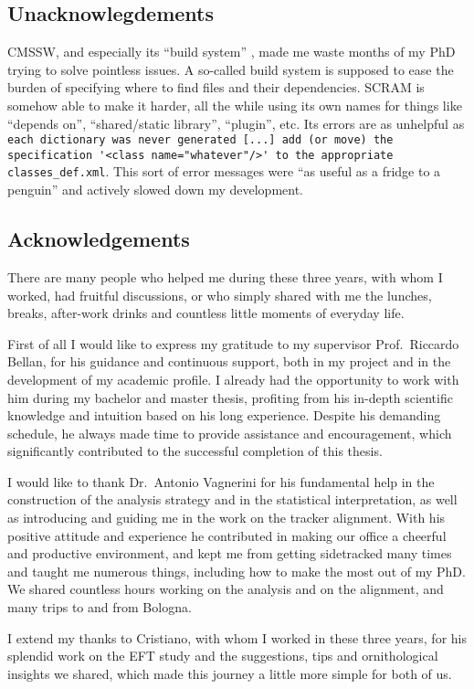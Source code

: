 \subsection{Unacknowlegdements}
CMSSW, and especially its ``build system'' , made me waste months of my PhD trying to solve pointless issues.
A so-called build system is supposed to ease the burden of specifying where to find files and their dependencies.
SCRAM is somehow able to make it harder, all the while using its own names for things like ``depends on'', ``shared/static library'', ``plugin'', etc.
Its errors are as unhelpful as \verb|each dictionary was never generated [...] add (or move) the specification '<class name="whatever"/>' to the appropriate classes_def.xml|.
This sort of error messages were ``as useful as a fridge to a penguin'' and actively slowed down my development.

\subsection{Acknowledgements}
There are many people who helped me during these three years, with whom I worked, had fruitful discussions,
or who simply shared with me the lunches, breaks, after-work drinks and countless little moments of everyday life.

First of all I would like to express my gratitude to my supervisor Prof.~Riccardo Bellan, for his guidance and continuous support,
both in my project and in the development of my academic profile.
I already had the opportunity to work with him during my bachelor and master thesis,
profiting from his in-depth scientific knowledge and intuition based on his long experience.
Despite his demanding schedule, he always made time to provide assistance and encouragement,
which significantly contributed to the successful completion of this thesis.

I would like to thank Dr.~Antonio Vagnerini
for his fundamental help in the construction of the analysis strategy and in the statistical interpretation,
as well as introducing and guiding me in the work on the tracker alignment.
With his positive attitude and experience he contributed in making our office a cheerful and productive environment,
and kept me from getting sidetracked many times and taught me numerous things, including how to make the most out of my PhD.
We shared countless hours working on the analysis and on the alignment, and many trips to and from Bologna.

I extend my thanks to Cristiano, with whom I worked in these three years,
for his splendid work on the EFT study and the suggestions, tips and ornithological insights we shared,
which made this journey a little more simple for both of us.

